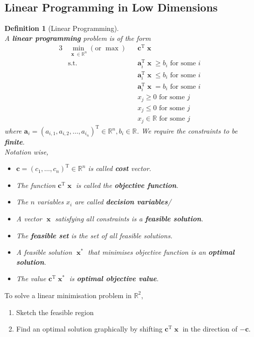 \documentclass[12pt]{article}
\newcommand{\st}{\mathrm{s.t.}}
\newcommand{\T}{\mathrm{T}}
\newtheorem{definition}{Definition}[section]
\theoremstyle{definition}
\DeclareMathOperator{\x}{\mathbf{x}}
\begin{document}
\subsection{Linear Programming in Low Dimensions}
\begin{definition}[Linear Programming]
\hfill\\\normalfont A \textbf{linear programming} problem is of the form
\begin{alignat*}{3}
&\min_{\x\in\mathbb{R}^n}(\text{or }\max)&&\mathbf{c}^\T\x\\
&\st&&\mathbf{a}_i^\T\x\geq b_i\text{ for some }i\\
&&&\mathbf{a}_i^\T\x\leq b_i\text{ for some }i\\
&&&\mathbf{a}_i^\T\x=b_i\text{ for some }i\\
&&&x_j\geq 0\text{ for some }j\\
&&&x_j\leq 0\text{ for some }j\\
&&&x_j\in\mathbb{R}\text{ for some }j
\end{alignat*}
where $\mathbf{a}_i=(a_{i,1},a_{i,2},\ldots, a_{i_n})^\T\in\mathbb{R}^n, b_i\in\mathbb{R}$. We require the constraints to be \textbf{finite}.\\
Notation wise,
\begin{itemize}
\item $\mathbf{c}=(c_1,\ldots, c_n)^\T\in\mathbb{R}^n$ is called \textbf{cost} vector. 
\item The function $\mathbf{c}^\T\x$ is called the \textbf{objective function}.
\item The $n$ variables $x_i$ are called \textbf{decision variables}/
\item A vector $\x$ satisfying all constraints is a \textbf{feasible solution}.
\item The \textbf{feasible set} is the set of all feasible solutions.
\item A feasible solution $\x^\ast$ that minimises objective function is an \textbf{optimal solution}.
\item The value $\mathbf{c}^\T\x^\ast$ is \textbf{optimal objective value}.
\end{itemize}
\end{definition}
To solve a linear minimisation problem in $\mathbb{R}^2$,
\begin{enumerate}
  \item Sketch the feasible region
  \item Find an optimal solution graphically by shifting $\mathbf{c}^\T\x$ in the direction of $-\mathbf{c}$.
\end{enumerate}
\end{document}
